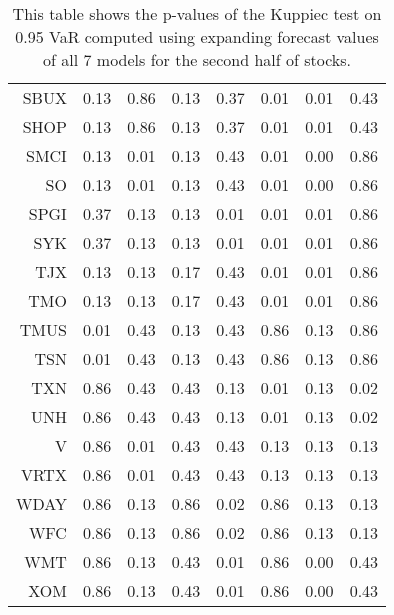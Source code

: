 \begin{table}[ht]
\begin{tabular}{rrrrrrrr}
  SBUX & 0.13 & 0.86 & 0.13 & 0.37 & 0.01 & 0.01 & 0.43 \\ 
  SHOP & 0.13 & 0.86 & 0.13 & 0.37 & 0.01 & 0.01 & 0.43 \\ 
  SMCI & 0.13 & 0.01 & 0.13 & 0.43 & 0.01 & 0.00 & 0.86 \\ 
  SO & 0.13 & 0.01 & 0.13 & 0.43 & 0.01 & 0.00 & 0.86 \\ 
  SPGI & 0.37 & 0.13 & 0.13 & 0.01 & 0.01 & 0.01 & 0.86 \\ 
  SYK & 0.37 & 0.13 & 0.13 & 0.01 & 0.01 & 0.01 & 0.86 \\ 
  TJX & 0.13 & 0.13 & 0.17 & 0.43 & 0.01 & 0.01 & 0.86 \\ 
  TMO & 0.13 & 0.13 & 0.17 & 0.43 & 0.01 & 0.01 & 0.86 \\ 
  TMUS & 0.01 & 0.43 & 0.13 & 0.43 & 0.86 & 0.13 & 0.86 \\ 
  TSN & 0.01 & 0.43 & 0.13 & 0.43 & 0.86 & 0.13 & 0.86 \\ 
  TXN & 0.86 & 0.43 & 0.43 & 0.13 & 0.01 & 0.13 & 0.02 \\ 
  UNH & 0.86 & 0.43 & 0.43 & 0.13 & 0.01 & 0.13 & 0.02 \\ 
  V & 0.86 & 0.01 & 0.43 & 0.43 & 0.13 & 0.13 & 0.13 \\ 
  VRTX & 0.86 & 0.01 & 0.43 & 0.43 & 0.13 & 0.13 & 0.13 \\ 
  WDAY & 0.86 & 0.13 & 0.86 & 0.02 & 0.86 & 0.13 & 0.13 \\ 
  WFC & 0.86 & 0.13 & 0.86 & 0.02 & 0.86 & 0.13 & 0.13 \\ 
  WMT & 0.86 & 0.13 & 0.43 & 0.01 & 0.86 & 0.00 & 0.43 \\ 
  XOM & 0.86 & 0.13 & 0.43 & 0.01 & 0.86 & 0.00 & 0.43 \\ 
   \hline
\end{tabular}
\caption[Kupiec test p-values, alpha =0.95 (2)]{This table shows the p-values of the Kuppiec test on 0.95 VaR computed using expanding forecast values of all 7 models for the second half of stocks.} 
\label{Table:Kupiec_test_expanding_0.95_2}
\end{table}
